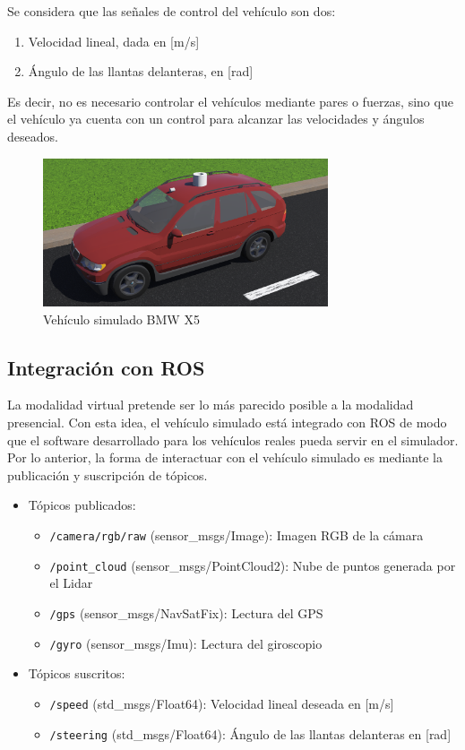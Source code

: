 \documentclass[letterpaper,12pt]{article}
\begin{document}
Se considera que las señales de control del vehículo son dos:
\begin{enumerate}
\item Velocidad lineal, dada en [m/s]
\item Ángulo de las llantas delanteras, en [rad]
\end{enumerate}
Es decir, no es necesario controlar el vehículos mediante pares o fuerzas, sino que el vehículo ya cuenta con un control para alcanzar las velocidades y ángulos deseados.

\begin{figure}
  \centering
  \includegraphics[width=0.75\textwidth]{Figures/Bmw.png}
  \caption{Vehículo simulado BMW X5}
  \label{fig:BmwX5}
\end{figure}

\subsection{Integración con ROS}
La modalidad virtual pretende ser lo más parecido posible a la modalidad presencial. Con esta idea, el vehículo simulado está integrado con ROS de modo que el software desarrollado para los vehículos reales pueda servir en el simulador. Por lo anterior, la forma de interactuar con el vehículo simulado es mediante la publicación y suscripción de tópicos.

\begin{itemize}
\item Tópicos publicados:
  \begin{itemize}
  \item \texttt{/camera/rgb/raw} (sensor\_msgs/Image): Imagen RGB de la cámara
  \item \texttt{/point\_cloud} (sensor\_msgs/PointCloud2): Nube de puntos generada por el Lidar
  \item \texttt{/gps} (sensor\_msgs/NavSatFix): Lectura del GPS
  \item \texttt{/gyro} (sensor\_msgs/Imu): Lectura del giroscopio
  \end{itemize}
\item Tópicos suscritos:
  \begin{itemize}
  \item \texttt{/speed} (std\_msgs/Float64): Velocidad lineal deseada en [m/s]
  \item \texttt{/steering} (std\_msgs/Float64): Ángulo de las llantas delanteras en [rad]
  \end{itemize}
\end{itemize}
\end{document}
